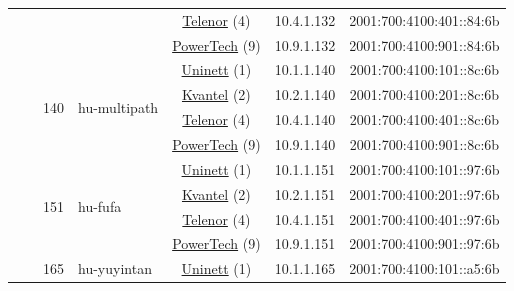 \begin{small}
\begin{center}
\begin{longtable}{|c|c|c|c|c|c|c|c|}
  &  &  &  & \multicolumn{2}{|c|}{\tiny{\href{https://www.telenor.no}{Telenor} (4)}} & \tiny{10.4.1.132} & \tiny{2001:700:4100:401::84:6b} \\* \cline{5-5}\cline{6-6}\cline{7-7}\cline{8-8}
  &  &  &  & \multicolumn{2}{|c|}{\tiny{\href{http://www.powertech.no}{PowerTech} (9)}} & \tiny{10.9.1.132} & \tiny{2001:700:4100:901::84:6b} \\* \cline{3-3}\cline{4-4}\cline{5-5}\cline{6-6}\cline{7-7}\cline{8-8}
  &  & \multirow{4}{*}{\tiny{140}} & \multicolumn{1}{|l|}{\multirow{4}{*}{\tiny{hu-multipath}}} & \multicolumn{2}{|c|}{\tiny{\href{https://www.uninett.no}{Uninett} (1)}} & \tiny{10.1.1.140} & \tiny{2001:700:4100:101::8c:6b} \\* \cline{5-5}\cline{6-6}\cline{7-7}\cline{8-8}
  &  &  &  & \multicolumn{2}{|c|}{\tiny{\href{http://kvantel.no}{Kvantel} (2)}} & \tiny{10.2.1.140} & \tiny{2001:700:4100:201::8c:6b} \\* \cline{5-5}\cline{6-6}\cline{7-7}\cline{8-8}
  &  &  &  & \multicolumn{2}{|c|}{\tiny{\href{https://www.telenor.no}{Telenor} (4)}} & \tiny{10.4.1.140} & \tiny{2001:700:4100:401::8c:6b} \\* \cline{5-5}\cline{6-6}\cline{7-7}\cline{8-8}
  &  &  &  & \multicolumn{2}{|c|}{\tiny{\href{http://www.powertech.no}{PowerTech} (9)}} & \tiny{10.9.1.140} & \tiny{2001:700:4100:901::8c:6b} \\* \cline{3-3}\cline{4-4}\cline{5-5}\cline{6-6}\cline{7-7}\cline{8-8}
  &  & \multirow{4}{*}{\tiny{151}} & \multicolumn{1}{|l|}{\multirow{4}{*}{\tiny{hu-fufa}}} & \multicolumn{2}{|c|}{\tiny{\href{https://www.uninett.no}{Uninett} (1)}} & \tiny{10.1.1.151} & \tiny{2001:700:4100:101::97:6b} \\* \cline{5-5}\cline{6-6}\cline{7-7}\cline{8-8}
  &  &  &  & \multicolumn{2}{|c|}{\tiny{\href{http://kvantel.no}{Kvantel} (2)}} & \tiny{10.2.1.151} & \tiny{2001:700:4100:201::97:6b} \\* \cline{5-5}\cline{6-6}\cline{7-7}\cline{8-8}
  &  &  &  & \multicolumn{2}{|c|}{\tiny{\href{https://www.telenor.no}{Telenor} (4)}} & \tiny{10.4.1.151} & \tiny{2001:700:4100:401::97:6b} \\* \cline{5-5}\cline{6-6}\cline{7-7}\cline{8-8}
  &  &  &  & \multicolumn{2}{|c|}{\tiny{\href{http://www.powertech.no}{PowerTech} (9)}} & \tiny{10.9.1.151} & \tiny{2001:700:4100:901::97:6b} \\* \cline{3-3}\cline{4-4}\cline{5-5}\cline{6-6}\cline{7-7}\cline{8-8}
  &  & \multirow{4}{*}{\tiny{165}} & \multicolumn{1}{|l|}{\multirow{4}{*}{\tiny{hu-yuyintan}}} & \multicolumn{2}{|c|}{\tiny{\href{https://www.uninett.no}{Uninett} (1)}} & \tiny{10.1.1.165} & \tiny{2001:700:4100:101::a5:6b} \\* \cline{5-5}\cline{6-6}\cline{7-7}\cline{8-8}

\end{longtable}
\end{center}
\end{small}
